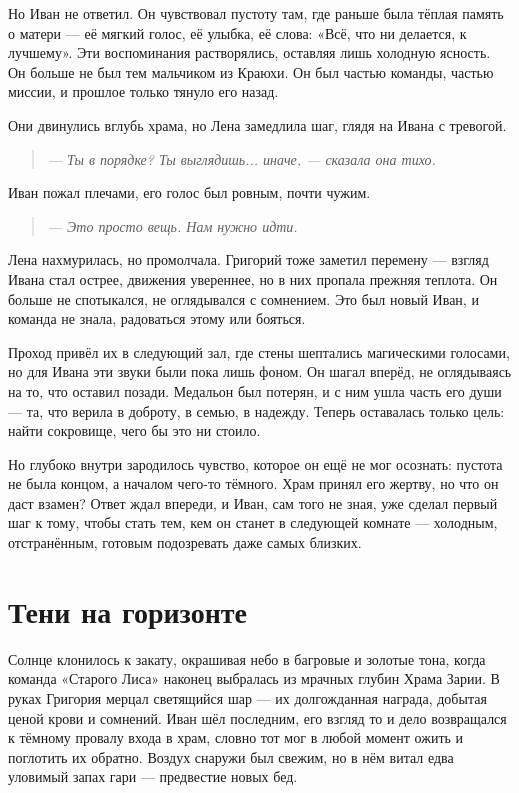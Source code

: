 \documentclass[12pt,a4paper]{book}
\newenvironment{dialogue}{\begin{quote}\itshape}{\end{quote}} %
\begin{document}
Но Иван не ответил. Он чувствовал пустоту там, где раньше была тёплая память о матери --- её мягкий голос, её улыбка, её слова: «Всё, что ни делается, к лучшему». Эти воспоминания растворялись, оставляя лишь холодную ясность. Он больше не был тем мальчиком из Краюхи. Он был частью команды, частью миссии, и прошлое только тянуло его назад.

Они двинулись вглубь храма, но Лена замедлила шаг, глядя на Ивана с тревогой.

\begin{dialogue}
--- Ты в порядке? Ты выглядишь... иначе, --- сказала она тихо.
\end{dialogue}

Иван пожал плечами, его голос был ровным, почти чужим.

\begin{dialogue}
--- Это просто вещь. Нам нужно идти.
\end{dialogue}

Лена нахмурилась, но промолчала. Григорий тоже заметил перемену --- взгляд Ивана стал острее, движения увереннее, но в них пропала прежняя теплота. Он больше не спотыкался, не оглядывался с сомнением. Это был новый Иван, и команда не знала, радоваться этому или бояться.

Проход привёл их в следующий зал, где стены шептались магическими голосами, но для Ивана эти звуки были пока лишь фоном. Он шагал вперёд, не оглядываясь на то, что оставил позади. Медальон был потерян, и с ним ушла часть его души --- та, что верила в доброту, в семью, в надежду. Теперь оставалась только цель: найти сокровище, чего бы это ни стоило.

Но глубоко внутри зародилось чувство, которое он ещё не мог осознать: пустота не была концом, а началом чего-то тёмного. Храм принял его жертву, но что он даст взамен? Ответ ждал впереди, и Иван, сам того не зная, уже сделал первый шаг к тому, чтобы стать тем, кем он станет в следующей комнате --- холодным, отстранённым, готовым подозревать даже самых близких.

\chapter{Тени на горизонте}

Солнце клонилось к закату, окрашивая небо в багровые и золотые тона, когда команда «Старого Лиса» наконец выбралась из мрачных глубин Храма Зарии. В руках Григория мерцал светящийся шар --- их долгожданная награда, добытая ценой крови и сомнений. Иван шёл последним, его взгляд то и дело возвращался к тёмному провалу входа в храм, словно тот мог в любой момент ожить и поглотить их обратно. Воздух снаружи был свежим, но в нём витал едва уловимый запах гари --- предвестие новых бед.
\end{document}
